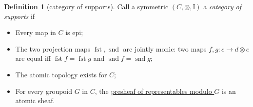 \documentclass[
  sigconf,
  screen, ]{acmart}
\theoremstyle{definition}
\newtheorem{definition}[theorem]{Definition}
\newcommand\nref[2]{\hyperref[#1]{#2}} \newcommand\checkhigh{{\huge{\color{red}\textbf{TODO: check}}}}
\newcommand\monunit{\mathrm{I}}
\newcommand\scmfst{\mathop{\nref{app:def:semicartesian-monoidal-category}{\mathrm{fst}}}}
\newcommand\scmsnd{\mathop{\nref{app:def:semicartesian-monoidal-category}{\mathrm{snd}}}}
\begin{document}
\begin{definition}[category of supports] \label{app:def:category-of-supports}
  Call a symmetric  $(C,\otimes,\monunit)$
  a \emph{category of supports} if \begin{itemize}
    \item Every map in $C$ is epi;
    \item The two projection maps $\scmfst ,\scmsnd $ 
      are jointly monic: two maps $f,g : c\to d\otimes e$
      are equal iff $\scmfst  f = \scmfst  g$ and $\scmsnd  f = \scmsnd  g$;
    \item The atomic topology exists for $C$;
    \item For every groupoid $G$ in $C$,
      the \nref{app:def:rep-mod-g}{presheaf of representables modulo $G$}
      is an atomic sheaf.
  \end{itemize}
\end{definition}
\end{document}
